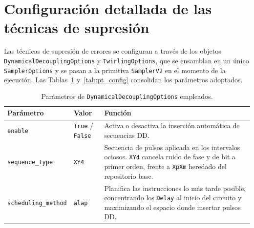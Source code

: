 \documentclass[12pt, spanish]{book}
\begin{document}
\section{Configuración detallada de las técnicas de supresión}
\label{app:supresion-config}

Las técnicas de supresión de errores se configuran a través de los objetos \texttt{DynamicalDecou\-plingOptions} y \texttt{TwirlingOptions}, que se ensamblan en un único \texttt{SamplerOptions} y se pasan a la primitiva \texttt{SamplerV2} en el momento de la ejecución. Las Tablas~\ref{tab:dd_config} y~\ref{tab:pt_config} consolidan los parámetros adoptados.

\begin{table}[H]
    \centering
    \caption{Parámetros de \texttt{DynamicalDecouplingOptions} empleados.}
    \label{tab:dd_config}
    \footnotesize
    \begin{tabular}{p{} p{} p{}}
        \toprule
        \textbf{Parámetro} & \textbf{Valor} & \textbf{Función} \\
        \midrule
        \texttt{enable}
            & \texttt{True} / \texttt{False}
            & Activa o desactiva la inserción automática de secuencias DD. \\
        \midrule
        \texttt{sequence\_type}
            & \texttt{XY4}
            & Secuencia de pulsos aplicada en los intervalos ociosos. \texttt{XY4} cancela ruido de fase y de bit a primer orden, frente a \texttt{XpXm} heredado del repositorio base. \\
        \midrule
        \texttt{scheduling\_method}
            & \texttt{alap}
            & Planifica las instrucciones lo más tarde posible, concentrando los \texttt{Delay} al inicio del circuito y maximizando el espacio donde insertar pulsos DD. \\
        \bottomrule
    \end{tabular}
\end{table}
\end{document}
